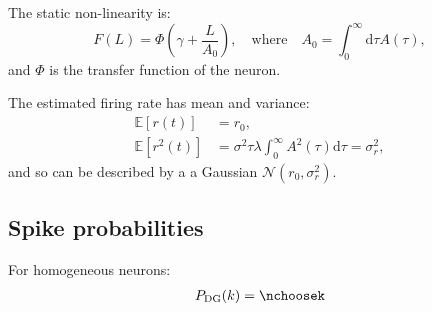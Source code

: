 \documentclass[11pt]{article}
\newcommand{\dd}{\mathrm{d}}
\begin{document}
The static non-linearity is:
\begin{equation}
F(L) = \Phi\left( \gamma + \frac{L}{A_0}\right),\quad \text{where}\quad A_0 = \int_0^\infty \dd \tau A(\tau),
\end{equation}
and $\Phi$ is the transfer function of the neuron.

The estimated firing rate has mean and variance:
\begin{align}
\mathbb{E}\left[ r(t) \right]~~\!&= r_0 ,\\
\mathbb{E}\left[ r^2(t) \right]&= \sigma^2\tau\lambda \int_0^\infty A^2(\tau) \dd \tau = \sigma_r^2,
\end{align}
and so can be described by a a Gaussian $\mathcal{N}(r_0,\sigma_r^2)$.

\subsection{Spike probabilities}
For homogeneous neurons:
\begin{align}
P_\text{DG}(k) = \nchoosek
\end{align}
\end{document}
